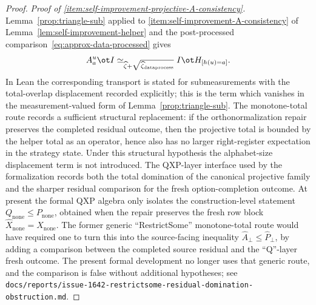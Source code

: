 \begin{proof}
  \emph{Proof of \ref{item:self-improvement-projective-A-consistency}.}
  Lemma~\ref{prop:triangle-sub} applied to \ref{item:self-improvement-A-consistency} of Lemma~\ref{lem:self-improvement-helper} and the post-processed comparison~\eqref{eq:approx-data-processed} gives
  \[
    A^u_a \ot I \simeq_{\widehat{\zeta} + \sqrt{\widehat{\zeta}_{\mathrm{dataprocess}}}}
    I \ot H_{[h(u) = a]}.
  \]
  In Lean the corresponding transport is stated for submeasurements with the
  total-overlap displacement recorded explicitly; this is the term which
  vanishes in the measurement-valued form of Lemma~\ref{prop:triangle-sub}.
  The monotone-total route records a sufficient structural replacement: if the
  orthonormalization repair preserves the completed residual outcome, then the
  projective total is bounded by the helper total as an operator, hence also
  has no larger right-register expectation in the strategy state.  Under this
  structural hypothesis the alphabet-size displacement term is not introduced.
  The QXP-layer interface used by the formalization records both the total
  domination of the canonical projective family and the sharper
  residual comparison for the fresh option-completion outcome.  At present the
  formal QXP algebra only isolates the construction-level statement
  \(Q_{\mathrm{none}} \leq P_{\mathrm{none}}\), obtained when the repair
  preserves the fresh row block \(\widehat X_{\mathrm{none}}=X_{\mathrm{none}}\).
  The former generic ``RestrictSome'' monotone-total route would have required
  one to turn this into the source-facing inequality
  \(\widehat A_{\bot} \leq \widehat P_{\bot}\), by adding a comparison between
  the completed source residual and the ``Q''-layer fresh outcome.  The present
  formal development no longer uses that generic route, and the comparison is
  false without additional hypotheses; see
  \texttt{docs/reports/issue-1642-restrictsome-residual-domination-obstruction.md}.

\end{proof}

